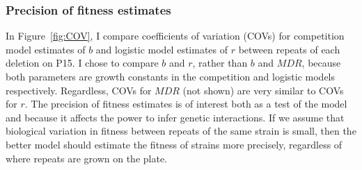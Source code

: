\begin{multicols}{2}





\subsubsection{Precision of fitness estimates}
\label{sec:cross_plate_validation}


In Figure~\ref{fig:COV}, I compare coefficients of variation (COVs)
for competition model estimates of \(b\) and logistic model estimates
of \(r\) between repeats of each deletion on P15. I chose to compare
\(b\) and \(r\), rather than \(b\) and \(MDR\), because both
parameters are growth constants in the competition and logistic models
respectively. Regardless, COVs for \(MDR\) (not shown) are very
similar to COVs for \(r\). The precision of fitness estimates is of
interest both as a test of the model and because it affects the power
to infer genetic interactions. If we assume that biological variation
in fitness between repeats of the same strain is small, then the
better model should estimate the fitness of strains more precisely,
regardless of where repeats are grown on the plate.


\end{multicols}
